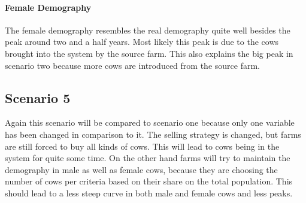 \paragraph{Female Demography}
The female demography resembles the real demography quite well besides the peak around two and a half years. Most likely this peak is due to the cows brought into the system by the source farm. This also explains the big peak in scenario two because more cows are introduced from the source farm.

\subsection{Scenario 5}
Again this scenario will be compared to scenario one because only one variable has been changed in comparison to it. The selling strategy is changed, but farms are still forced to buy all kinds of cows. This will lead to cows being in the system for quite some time. On the other hand farms will try to maintain the demography in male as well as female cows, because they are choosing the number of cows per criteria based on their share on the total population. This should lead to a less steep curve in both male and female cows and less peaks.
